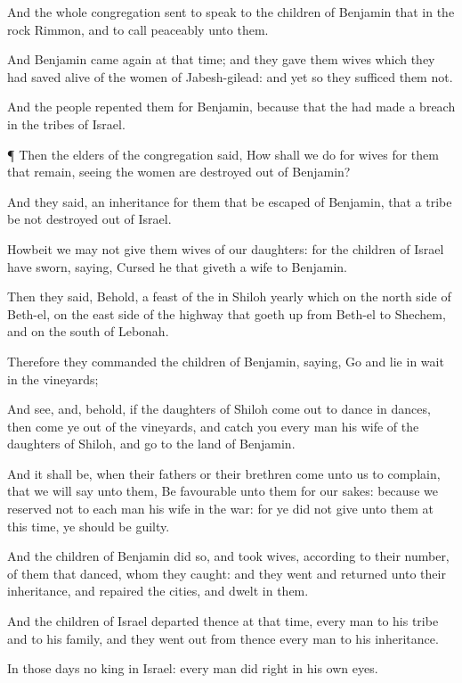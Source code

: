 {And the whole
congregation
sent
{} to
speak to the
children of
Benjamin that
{} in the
rock
Rimmon, and to
call
peaceably unto them.

And
Benjamin came
again at that
time; and they
gave them
wives which they had saved
alive of the
women of
Jabesh-gilead: and yet so they
sufficed them not.

And the
people
repented them for
Benjamin, because that the
{} had
made a
breach in the
tribes of
Israel.


\par }{\PP {}¶ Then the
elders of the
congregation
said, How shall we
do for
wives for them that
remain, seeing the
women are
destroyed out of
Benjamin?

And they
said,
{} an
inheritance for them that be
escaped of
Benjamin, that a
tribe be not
destroyed out of
Israel.

Howbeit we
may not
give them
wives of our
daughters: for the
children of
Israel have
sworn,
saying,
Cursed
{} he that
giveth a
wife to
Benjamin.

Then they
said, Behold,
{} a
feast of the
{} in
Shiloh
yearly
{} which
{} on the north
side of
Beth-el, on the east
side of the
highway that goeth
up from
Beth-el to
Shechem, and on the
south of
Lebonah.

Therefore they
commanded the
children of
Benjamin,
saying,
Go and lie in
wait in the
vineyards;

And
see, and, behold, if the
daughters of
Shiloh come
out to
dance in
dances, then come ye
out of the
vineyards, and
catch you every
man his
wife of the
daughters of
Shiloh, and
go to the
land of
Benjamin.

And it shall be, when their
fathers or their
brethren
come unto us to
complain, that we will
say unto them, Be
favourable unto them for our sakes: because we
reserved not to each
man his
wife in the
war: for ye did not
give unto them at this
time,
{} ye should be
guilty.

And the
children of
Benjamin did
so, and
took
{}
wives, according to their
number, of them that
danced, whom they
caught: and they
went and
returned unto their
inheritance, and
repaired the
cities, and
dwelt in them.

And the
children of
Israel
departed thence at that
time, every
man to his
tribe and to his
family, and they went
out from thence every
man to his
inheritance.

In those
days
{} no
king in
Israel: every
man
did
{}
right in his own
eyes.


\par }